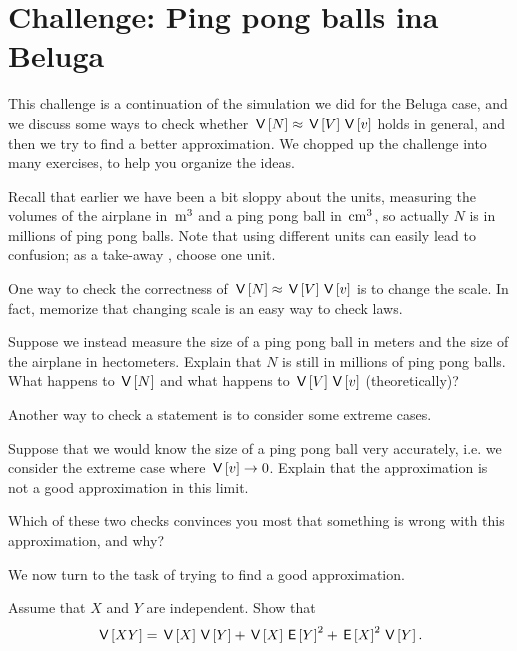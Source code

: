 \section{Challenge: Ping pong balls ina Beluga}

This challenge is a continuation of the simulation we did for the Beluga case, and we discuss some ways to check whether $\,\mathsf{V}\left[N\right] \approx \,\mathsf{V}\left[V\right] \,\mathsf{V}\left[v\right]$ holds in general, and then we try to find a better approximation. We chopped up the challenge into many exercises, to help you organize the ideas.


Recall that earlier we have been a bit sloppy about the units, measuring the volumes of the airplane in $\,\mathrm{m}^{3}$ and a ping pong ball in $\,\mathrm{cm}^{3}$, so actually $N$ is in millions of ping pong balls.
Note that using different units can easily lead to  confusion; as a take-away , choose one unit.

One way to check the correctness of $\,\mathsf{V}\left[N\right] \approx \,\mathsf{V}\left[V\right] \,\mathsf{V}\left[v\right]$ is to change the scale. In fact, memorize that changing scale is an easy way to check laws.

\begin{exercise}
Suppose we instead measure the size of a ping pong ball in meters and the size of the airplane in hectometers.
Explain that $N$ is still in millions of ping pong balls.
What happens to $\,\mathsf{V}\left[N\right]$ and what happens to $\,\mathsf{V}\left[V\right] \,\mathsf{V}\left[v\right]$ (theoretically)?
\end{exercise}


Another way to check a statement is to consider some extreme cases.

\begin{exercise} Suppose that we would know the size of a ping pong ball very accurately, i.e.  we consider the extreme case where $\,\mathsf{V}\left[v\right] \rightarrow 0$. Explain that the approximation is not a good approximation in this limit.
\end{exercise}


\begin{exercise}
Which of these two checks convinces you most that something is wrong with this approximation, and why?
\end{exercise}

We now turn to the task of trying to find a good approximation.

\begin{exercise} Assume that $X$ and $Y$ are independent. Show that
\begin{equation*}
\,\mathsf{V}\left[X Y\right] = \,\mathsf{V}\left[X\right] \,\mathsf{V}\left[Y\right] + \,\mathsf{V}\left[X\right] \,\mathsf{E}\left[Y\right]^2 + \,\mathsf{E}\left[X\right]^2 \,\mathsf{V}\left[Y\right].
\end{equation*}
\end{exercise}

